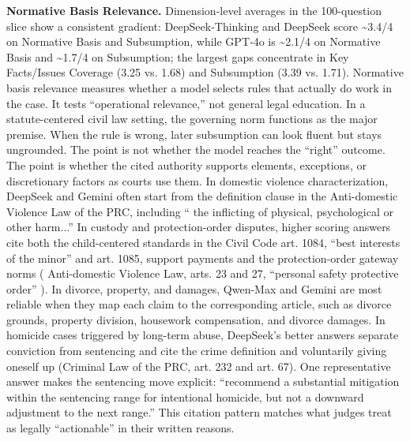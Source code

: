 {{{{{{{{{{{{{\textbf{Normative Basis Relevance.} Dimension-level averages in the 100-question slice show a consistent gradient: DeepSeek‑Thinking and DeepSeek score \textasciitilde3.4/4 on Normative Basis and Subsumption, while GPT‑4o is \textasciitilde2.1/4 on Normative Basis and \textasciitilde1.7/4 on Subsumption; the largest gaps concentrate in Key Facts/Issues Coverage (3.25 vs. 1.68) and Subsumption (3.39 vs. 1.71). Normative basis relevance measures whether a model selects rules that actually do work in the case. It tests ``operational relevance,'' not general legal education. In a statute-centered civil law setting, the governing norm functions as the major premise. When the rule is wrong, later subsumption can look fluent but stays ungrounded. The point is not whether the model reaches the ``right'' outcome. The point is whether the cited authority supports elements, exceptions, or discretionary factors as courts use them. In domestic violence characterization, DeepSeek and Gemini often start from the definition clause in the Anti-domestic Violence Law of the PRC, including `` the inflicting of physical, psychological or other harm...'' In custody and protection-order disputes, higher scoring answers cite both the child-centered standards in the Civil Code art. 1084, ``best interests of the minor'' and art. 1085, support payments and the protection-order gateway norms ( Anti-domestic Violence Law, arts. 23 and 27, ``personal safety protective order'' ). In divorce, property, and damages, Qwen-Max and Gemini are most reliable when they map each claim to the corresponding article, such as divorce grounds, property division, housework compensation, and divorce damages. In homicide cases triggered by long-term abuse, DeepSeek's better answers separate conviction from sentencing and cite the crime definition and voluntarily giving oneself up (Criminal Law of the PRC, art. 232 and art. 67). One representative answer makes the sentencing move explicit: ``recommend a substantial mitigation within the sentencing range for intentional homicide, but not a downward adjustment to the next range.'' This citation pattern matches what judges treat as legally ``actionable'' in their written reasons.

}}}}}}}}}}}}}
